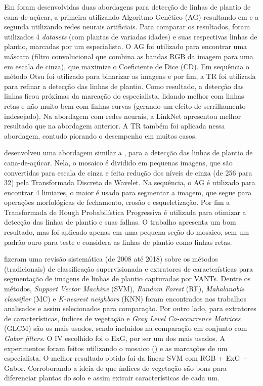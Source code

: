 \documentclass[12pt, a4paper, english, brazil]{article}
\begin{document}
Em  foram desenvolvidas duas abordagens para detecção de linhas de plantio de cana-de-açúcar, a primeira utilizando Algoritmo Genético (AG) resultando em  e a segunda utilizando redes neurais artificiais. Para comparar os resultados, foram utilizados 4 \textit{datasets} (com plantas de variadas idades) e suas respectivas linhas de plantio, marcadas por um especialista. O AG foi utilizado para encontrar uma máscara (filtro convolucional que combina as bandas RGB da imagem para uma em escala de cinza), que maximize o Coeficiente de Dice (CD). Em sequência o método Otsu foi utilizado para binarizar as imagens e por fim, a TR foi utilizada para refinar a detecção das linhas de plantio. Como resultado, a detecção das linhas ficou próximas da marcação do especialista, lidando melhor com linhas retas e não muito bem com linhas curvas (gerando um efeito de serrilhamento indesejado). Na abordagem com redes neurais, a LinkNet apresentou melhor resultado que na abordagem anterior. A TR também foi aplicada nessa abordagem, contudo piorando o desempenho em muitos casos.

 desenvolveu uma abordagem similar a , para a detecção das linhas de plantio de cana-de-açúcar. Nela, o mosaico é dividido em pequenas imagens, que são convertidas para escala de cinza e feita redução dos níveis de cinza (de 256 para 32) pela Transformada Discreta de Wavelet. Na sequência, o AG é utilizado para encontrar 4 limiares, o maior é usado para segmentar a imagem, que segue para operações morfológicas de fechamento, erosão e esqueletização. Por fim a Transformada de Hough Probabilística Progressiva é utilizada para otimizar a detecção das linhas de plantio e suas falhas. O trabalho apresenta um bom resultado, mas foi aplicado apenas em uma pequena seção do mosaico, sem um padrão ouro para teste e considera as linhas de plantio como linhas retas.


 fizeram uma revisão sistemática (de 2008 até 2018) sobre os métodos (tradicionais) de classificação supervisionada e extratores de características para segmentação de imagens de linhas de plantio capturadas por VANTs. Dentre os métodos, \textit{Support Vector Machine} (SVM), \textit{Random Forest} (RF), \textit{Mahalanobis classifier} (MC) e \textit{K-nearest neighbors} (KNN) foram encontrados nos trabalhos analisados e assim selecionados para comparação. Por outro lado, para extratores de características, índices de vegetação e \textit{Gray Level Co-occurrence Matrices} (GLCM) são os mais usados, sendo incluídos na comparação em conjunto com \textit{Gabor filters}. O IV escolhido foi o ExG, por ser um dos mais usados. A experimentos foram feitos utilizando o mosaico (\cite{CropRowsDataset2019}) e as marcações de um especialista. O melhor resultado obtido foi da linear SVM com RGB + ExG + Gabor. Corroborando a ideia de que índices de vegetação são bons para diferenciar plantas do solo e assim extrair características de cada um.
\end{document}

